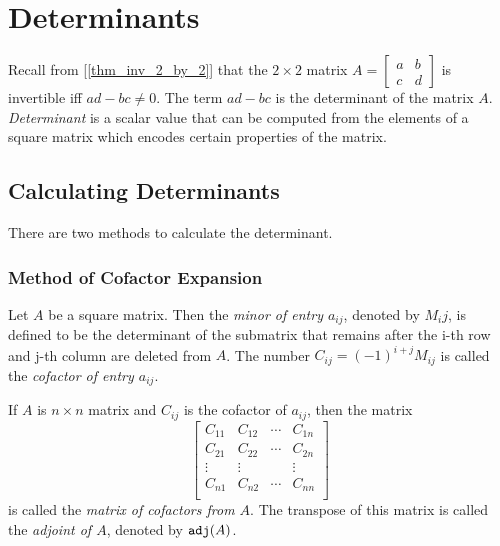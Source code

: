 \documentclass{report}
\begin{document}
	
	\section{Determinants}
		Recall from [\ref{thm_inv_2_by_2}] that the $2 \times 2$ matrix $A=\begin{bmatrix} a & b \\ c & d \end{bmatrix}$ is invertible iff $ad-bc \ne 0$. The term $ad-bc$ is the determinant of the matrix $A$. \emph{Determinant} is a scalar value that can be computed from the elements of a square matrix which encodes certain properties of the matrix.
		\subsection{Calculating Determinants}
			There are two methods to calculate the determinant.
			\subsubsection{Method of Cofactor Expansion}
				\begin{defn}
					Let $A$ be a square matrix. Then the \emph{minor of entry $a_{ij}$}, denoted by $M_ij$, is defined to be the determinant of the submatrix that remains after the i-th row and j-th column are deleted from $A$. The number $C_{ij}=(-1)^{i+j}M_{ij}$ is called the \emph{cofactor of entry $a_{ij}$}.
				\end{defn}
				
				\begin{defn}[Adjoint]
					If $A$ is $n \times n$ matrix and $C_{ij}$ is the cofactor of $a_{ij}$, then the matrix
					\begin{displaymath}
					\begin{bmatrix}
						C_{11} & C_{12} & \cdots & C_{1n} \\
						C_{21} & C_{22} & \cdots & C_{2n} \\
						\vdots & \vdots &        & \vdots \\
						C_{n1} & C_{n2} & \cdots & C_{nn} \\
					\end{bmatrix}
					\end{displaymath}
					is called the \emph{matrix of cofactors from $A$}. The transpose of this matrix is called the \emph{adjoint of $A$}, denoted by $\verb|adj|(A)$.
				\end{defn}
				
\end{document}
